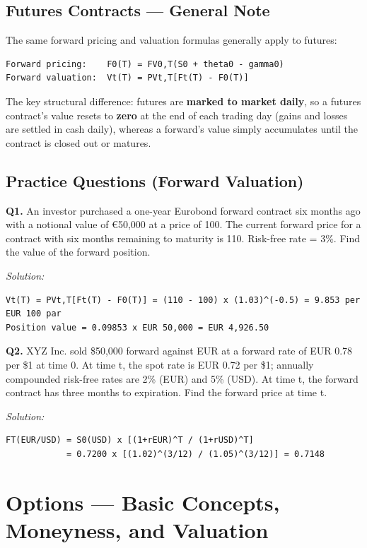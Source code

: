 \documentclass[12pt,openany]{book}
\theoremstyle{definition}
\theoremstyle{remark}
\begin{document}
\subsection{Futures Contracts — General Note}

The same forward pricing and valuation formulas generally apply to futures:
\begin{lstlisting}[style=notesCode]
Forward pricing:    F0(T) = FV0,T(S0 + theta0 - gamma0)
Forward valuation:  Vt(T) = PVt,T[Ft(T) - F0(T)]
\end{lstlisting}
The key structural difference: futures are \textbf{marked to market daily}, so a futures contract's value resets to \textbf{zero} at the end of each trading day (gains and losses are settled in cash daily), whereas a forward's value simply accumulates until the contract is closed out or matures.

\subsection{Practice Questions (Forward Valuation)}

\textbf{Q1.} An investor purchased a one-year Eurobond forward contract six months ago with a notional value of €50,000 at a price of 100. The current forward price for a contract with six months remaining to maturity is 110. Risk-free rate = 3\%. Find the value of the forward position.

\emph{Solution:}
\begin{lstlisting}[style=notesCode]
Vt(T) = PVt,T[Ft(T) - F0(T)] = (110 - 100) x (1.03)^(-0.5) = 9.853 per EUR 100 par
Position value = 0.09853 x EUR 50,000 = EUR 4,926.50
\end{lstlisting}

\textbf{Q2.} XYZ Inc. sold \$50,000 forward against EUR at a forward rate of EUR 0.78 per \$1 at time 0. At time t, the spot rate is EUR 0.72 per \$1; annually compounded risk-free rates are 2\% (EUR) and 5\% (USD). At time t, the forward contract has three months to expiration. Find the forward price at time t.

\emph{Solution:}
\begin{lstlisting}[style=notesCode]
FT(EUR/USD) = S0(USD) x [(1+rEUR)^T / (1+rUSD)^T]
            = 0.7200 x [(1.02)^(3/12) / (1.05)^(3/12)] = 0.7148
\end{lstlisting}


\section{Options — Basic Concepts, Moneyness, and Valuation}
\end{document}
